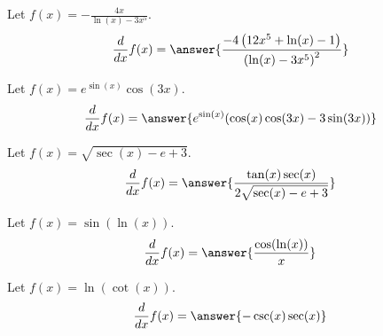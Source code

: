 \documentclass{ximera}
\begin{document}
\begin{shuffle}

\begin{exercise}
Let $f(x)=-\frac{4 x}{\ln (x)-3 x^5}$.
\[
\ddx f(x) = \answer{\frac{-4 \left(12 x^5+\ln (x)-1\right)}{\left(\ln (x)-3 x^5\right)^2}}
\]
\end{exercise}

\begin{exercise}
Let $f(x)=e^{\sin (x)} \cos (3 x)$.
\[
\ddx f(x) = \answer{e^{\sin (x)} (\cos (x) \cos (3 x)-3 \sin (3 x))}
\]
\end{exercise}

\begin{exercise}
Let $f(x)=\sqrt{\sec (x)-e+3}$.
\[
\ddx f(x) = \answer{\frac{\tan (x) \sec (x)}{2 \sqrt{\sec (x)-e+3}}}
\]
\end{exercise}

\begin{exercise}
Let $f(x)=\sin (\ln (x))$.
\[
\ddx f(x) = \answer{\frac{\cos (\ln (x))}{x}}
\]
\end{exercise}

\begin{exercise}
Let $f(x)=\ln (\cot (x))$.
\[
\ddx f(x) = \answer{-\csc (x) \sec (x)}
\]
\end{exercise}
\end{shuffle}
\end{document}
